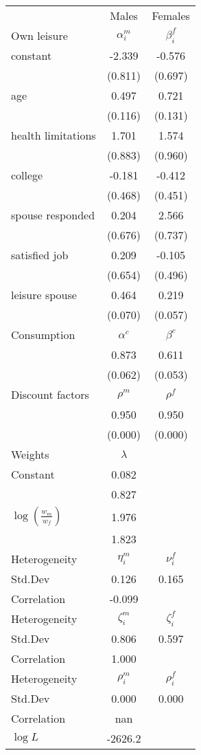 \begin{tabular}{lcc} 
\hline\hline 
 & Males & Females \\ 
Own leisure & $\alpha_{i}^{m}$ & $\beta_{i}^{f}$ \\ 
constant & -2.339 & -0.576 \\ 
 & (0.811) & (0.697) \\ 
age & 0.497 & 0.721 \\ 
 & (0.116) & (0.131) \\ 
health limitations & 1.701 & 1.574 \\ 
 & (0.883) & (0.960) \\ 
college & -0.181 & -0.412 \\ 
 & (0.468) & (0.451) \\ 
spouse responded & 0.204 & 2.566 \\ 
 & (0.676) & (0.737) \\ 
satisfied job & 0.209 & -0.105 \\ 
 & (0.654) & (0.496) \\ 
leisure spouse & 0.464 & 0.219 \\ 
 & (0.070) & (0.057) \\ 
Consumption & $\alpha^{c}$ & $\beta^{c}$ \\ 
 & 0.873 & 0.611 \\ 
 & (0.062) & (0.053) \\ 
Discount factors & $\rho^m$ & $\rho^f$ \\ 
 & 0.950 & 0.950 \\ 
 & (0.000) & (0.000) \\ 
Weights & $\lambda$ &  \\ 
Constant & 0.082 &  \\ 
 & 0.827 &  \\ 
$\log(\frac{w_m}{w_f})$ & 1.976 &  \\ 
 & 1.823 &  \\ 
Heterogeneity & $\eta_i^m$ & $\nu_i^f$ \\ 
Std.Dev & 0.126 & 0.165 \\ 
Correlation & -0.099 &  \\ 
Heterogeneity & $\zeta_i^m$ & $\zeta_i^f$ \\ 
Std.Dev & 0.806 & 0.597 \\ 
Correlation & 1.000 &  \\ 
Heterogeneity & $\rho_i^m$ & $\rho_i^f$ \\ 
Std.Dev & 0.000 & 0.000 \\ 
Correlation & nan &  \\ 
\hline 
$\log L$ & -2626.2 & \\ 
\hline \hline 
\end{tabular} 
